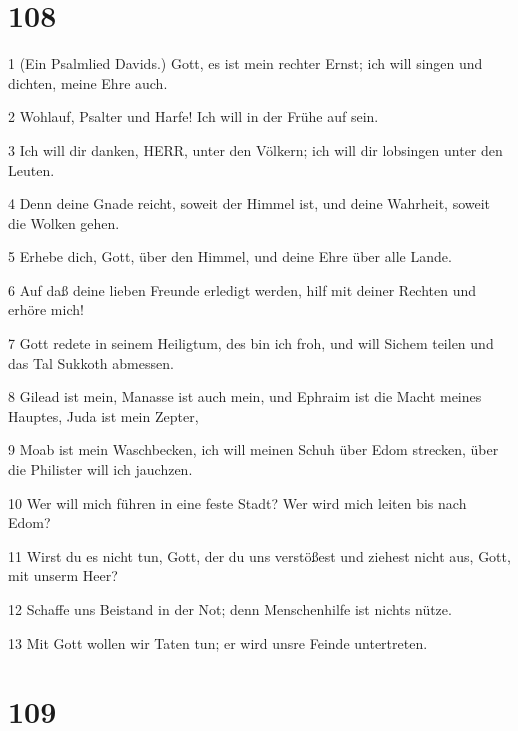 \chapter{108}

\par 1 (Ein Psalmlied Davids.) Gott, es ist mein rechter Ernst; ich will singen und dichten, meine Ehre auch.
\par 2 Wohlauf, Psalter und Harfe! Ich will in der Frühe auf sein.
\par 3 Ich will dir danken, HERR, unter den Völkern; ich will dir lobsingen unter den Leuten.
\par 4 Denn deine Gnade reicht, soweit der Himmel ist, und deine Wahrheit, soweit die Wolken gehen.
\par 5 Erhebe dich, Gott, über den Himmel, und deine Ehre über alle Lande.
\par 6 Auf daß deine lieben Freunde erledigt werden, hilf mit deiner Rechten und erhöre mich!
\par 7 Gott redete in seinem Heiligtum, des bin ich froh, und will Sichem teilen und das Tal Sukkoth abmessen.
\par 8 Gilead ist mein, Manasse ist auch mein, und Ephraim ist die Macht meines Hauptes, Juda ist mein Zepter,
\par 9 Moab ist mein Waschbecken, ich will meinen Schuh über Edom strecken, über die Philister will ich jauchzen.
\par 10 Wer will mich führen in eine feste Stadt? Wer wird mich leiten bis nach Edom?
\par 11 Wirst du es nicht tun, Gott, der du uns verstößest und ziehest nicht aus, Gott, mit unserm Heer?
\par 12 Schaffe uns Beistand in der Not; denn Menschenhilfe ist nichts nütze.
\par 13 Mit Gott wollen wir Taten tun; er wird unsre Feinde untertreten.

\chapter{109}


